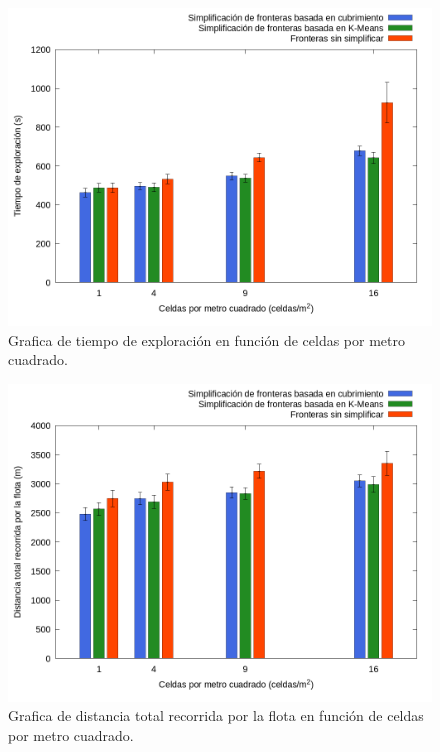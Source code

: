 




\begin{figure}[H]
  \centerfloat

  \includegraphics[clip=true, width=\graphlen]{imagenes/graficas_chicas/graficas_histo_num/ident_obj/exploration_time.png}

  \caption{Grafica de tiempo de exploración en función de celdas por metro cuadrado.}\label{fig:gra:idobj:et}

\end{figure}

\begin{figure}[H]
  \centerfloat

  \includegraphics[clip=true, width=\graphlen]{imagenes/graficas_chicas/graficas_histo_num/ident_obj/exploration_cost.png}

  \caption{Grafica de distancia total recorrida por la flota en función de celdas por metro cuadrado.}\label{fig:gra:idobj:ec}

\end{figure}

